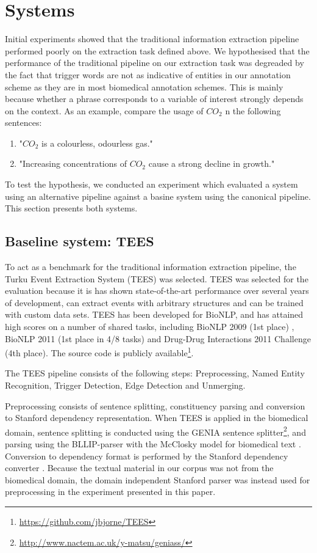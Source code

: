 \section{Systems}

Initial experiments showed that the traditional information extraction pipeline performed poorly on the extraction task defined above. We hypothesised that the performance of the traditional pipeline on our extraction task was degreaded by the fact that trigger words are not as indicative of entities in our annotation scheme as they are in most biomedical annotation schemes. This is mainly because whether a phrase corresponds to a variable of interest strongly depends on the context. As an example, compare the usage of $CO_2$ n the following sentences:

\begin{enumerate}
	\item "$CO_2$ is a colourless, odourless gas." 
	\item "Increasing concentrations of $CO_2$ cause a strong decline in growth."
\end{enumerate}

To test the hypothesis, we conducted an experiment which evaluated a system using an alternative pipeline against a basine system using the canonical pipeline. This section presents both systems.

\subsection{Baseline system: TEES}

To act as a benchmark for the traditional information extraction pipeline, the Turku Event Extraction System (TEES) \citep{bjo11ddi} was selected. TEES was selected for the evaluation because it is has shown state-of-the-art performance over several years of development, can extract events with arbitrary structures and can be trained with custom data sets. TEES has been developed for BioNLP, and has attained high scores on a number of shared tasks, including BioNLP 2009 (1st place) \citep{bjo09}, BioNLP 2011 (1st place in 4/8 tasks) \citep{bjo11} and Drug-Drug Interactions 2011 Challenge (4th place)\citep{bjo11ddi}. The source code is publicly available\footnote{\url{https://github.com/jbjorne/TEES}}.

The TEES pipeline consists of the following steps: Preprocessing, Named Entity Recognition, Trigger Detection, Edge Detection and Unmerging. 

Preprocessing consists of sentence splitting, constituency parsing and conversion to Stanford dependency representation\citep{dem08}. When TEES is applied in the biomedical domain, sentence splitting is conducted using the GENIA sentence splitter\footnote{\url{http://www.nactem.ac.uk/y-matsu/geniass/}}, and parsing using the BLLIP-parser \citep{cha05} with the McClosky model for biomedical text \citep{mcc08}. Conversion to dependency format is performed by the Stanford dependency converter \citep{dem08}. Because the textual material in our corpus was not from the biomedical domain, the domain independent Stanford parser \citep{kle03} was instead used for preprocessing in the experiment presented in this paper.

